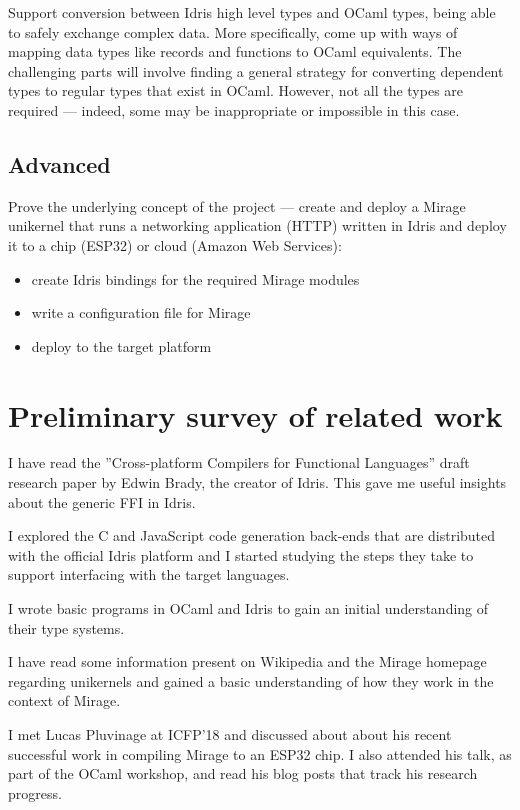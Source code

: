 \documentclass[a4paper]{report}
\begin{document}
Support conversion between Idris high level types and OCaml types,
being able to safely exchange complex data.
More specifically, come up with ways of mapping data types like records and
functions to OCaml equivalents.
The challenging parts will involve finding a general strategy for converting
dependent types to regular types that exist in OCaml. However, not all the types are required --- indeed, some may be inappropriate or impossible in this
case.

\subsection{Advanced}
Prove the underlying concept of the project --- create and deploy a Mirage
unikernel that runs a networking application (HTTP) written in Idris and
deploy it to a chip (ESP32) or cloud (Amazon Web Services):
\begin{itemize}
	\item create Idris bindings for the required Mirage modules
	\item write a configuration file for Mirage
	\item deploy to the target platform
\end{itemize}



\section{Preliminary survey of related work}
I have read the ''Cross-platform Compilers for Functional Languages'' draft
research paper by Edwin Brady, the creator of Idris.
This gave me useful insights about the generic FFI in Idris.

I explored the C and JavaScript code generation back-ends that are distributed
with the official Idris platform and I started studying the steps they take to
support interfacing with the target languages.

I wrote basic programs in OCaml and Idris to gain an initial understanding of
their type systems.

I have read some information present on Wikipedia and the Mirage homepage
regarding unikernels and gained a basic understanding of how they
work in the context of Mirage.

I met Lucas Pluvinage at ICFP'18 and discussed about about his recent
successful work in compiling Mirage to an ESP32 chip.
I also attended his talk, as part of the OCaml workshop, and read
his blog posts that track his research progress.
\end{document}
